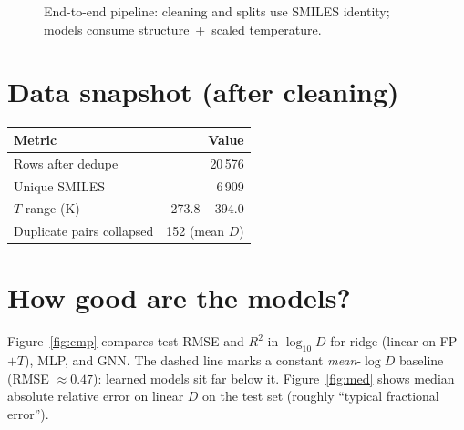 \documentclass[11pt,a4paper]{article}
\begin{document}
\begin{figure}[ht]
  \centering
  \caption{End-to-end pipeline: cleaning and splits use SMILES identity; models consume structure~+~scaled temperature.}
  \label{fig:pipe}
\end{figure}

\section*{Data snapshot (after cleaning)}
\begin{center}
\begin{tabular}{@{}lr@{}}
\toprule
Metric & Value \\
\midrule
Rows after dedupe & 20\,576 \\
Unique SMILES & 6\,909 \\
$T$ range (K) & 273.8 -- 394.0 \\
Duplicate pairs collapsed & 152 (mean $D$) \\
\bottomrule
\end{tabular}
\end{center}

\section*{How good are the models?}
Figure~\ref{fig:cmp} compares test RMSE and $R^2$ in $\log_{10} D$ for ridge (linear on FP$+T$), MLP, and GNN. The dashed line marks a constant \emph{mean}-$\log D$ baseline (RMSE $\approx 0.47$): learned models sit far below it. Figure~\ref{fig:med} shows median absolute relative error on linear $D$ on the test set (roughly ``typical fractional error'').
\end{document}
